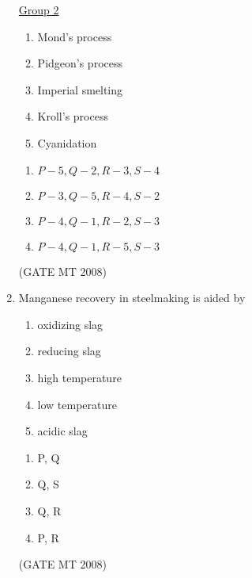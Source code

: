\documentclass[11pt, letterpaper]{article}
\theoremstyle{remark}
\begin{document}
\begin{enumerate}[label=Q.\arabic*]
\begin{multicols}{2}
     \underline{Group 2}
    \begin{enumerate}[label=(\arabic*), start=1]
        \item Mond's process
        \item Pidgeon's process
        \item Imperial smelting
        \item Kroll's process
        \item Cyanidation
    \end{enumerate}
\end{multicols}
\vspace{-2em}
\begin{multicols}{2}
      \begin{enumerate}
        \item $P-5, Q-2, R-3, S-4$
        \item $P-3, Q-5, R-4, S-2$
        \item $P-4, Q-1, R-2, S-3$
        \item $P-4, Q-1, R-5, S-3$
      \end{enumerate}
    \end{multicols}
\vspace{-5mm}
\hfill(GATE MT 2008)

\item Manganese recovery in steelmaking is aided by
\begin{enumerate}[label=(\MakeUppercase{\alph*}), start=16]
        \item oxidizing slag
        \item reducing slag
        \item high temperature
        \item low temperature
        \item acidic slag 
    \end{enumerate}
\vspace{-0.9em}
 \begin{multicols}{4}
   \begin{enumerate}[label=(\MakeUppercase{\alph*})]
        \item P, Q
        \item Q, S
        \item Q, R
        \item P, R
   \end{enumerate}
 \end{multicols}
\vspace{-5mm}
\hfill(GATE MT 2008)


\end{enumerate}
\end{document}
